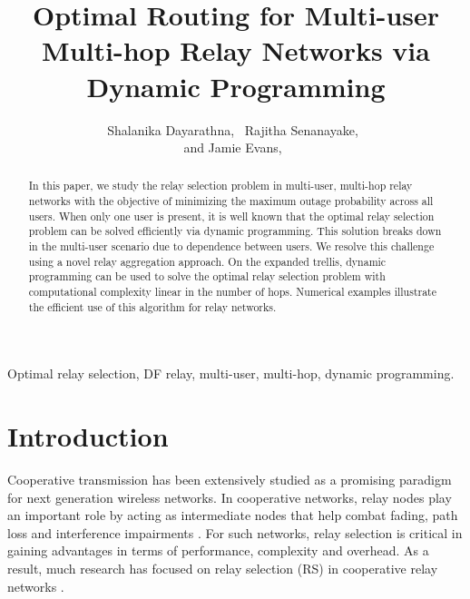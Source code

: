 \documentclass[12pt,draftclsnofoot,onecolumn]{IEEEtran}
\begin{document}
	
	\title{Optimal Routing for Multi-user Multi-hop Relay Networks via Dynamic Programming}
	\author{
		Shalanika Dayarathna,~ Rajitha Senanayake,~ \\ and Jamie Evans,~ 
	}	
	\maketitle
	
	\begin{abstract}
		In this paper, we study the relay selection problem in multi-user, multi-hop relay networks with the objective of minimizing the maximum outage probability across all users. When only one user is present, it is well known that the optimal relay selection problem can be solved efficiently via dynamic programming.  This solution breaks down in the multi-user scenario due to dependence between users. We resolve this challenge using a novel relay aggregation approach. On the expanded trellis, dynamic programming can be used to solve the optimal relay selection problem with computational complexity linear in the number of hops. Numerical examples illustrate the efficient use of this algorithm for relay networks.
	\end{abstract}
	
	\begin{IEEEkeywords}
		Optimal relay selection, DF relay, multi-user, multi-hop, dynamic programming.
	\end{IEEEkeywords}
	
	\section{Introduction}\label{Sec-Intro}
	Cooperative transmission has been extensively studied as a promising paradigm for next generation wireless networks. In cooperative networks, relay nodes play an important role by acting as intermediate nodes that help combat fading, path loss and interference impairments \cite{electronics9030443}. For such networks, relay selection is critical in gaining advantages in terms of performance, complexity and overhead. As a result, much research has focused on relay selection (RS) in cooperative relay networks \cite{2809748,2970744,s18103263,3020299}. 
	
\end{document}

